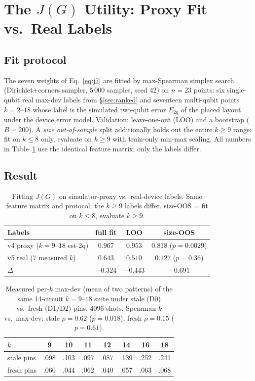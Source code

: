 \documentclass[journal,10pt,twocolumn]{IEEEtran}
\begin{document}
\section{The \texorpdfstring{$J(G)$}{J(G)} Utility: Proxy Fit vs.\ Real Labels}
\label{sec:jreal}

\subsection{Fit protocol}
The seven weights of Eq.~\eqref{eq:j7} are fitted by max-Spearman simplex search (Dirichlet$+$corners sampler,
5\,000 samples, seed 42) on $n{=}23$ points: six single-qubit real max-dev labels from \S\ref{sec:ranked} and
seventeen multi-qubit points $k{=}2$--$18$ whose label is the simulated two-qubit error
$E_{\mathrm{2q}}$ of the placed layout under the device error model. Validation: leave-one-out (LOO) and a
bootstrap ($B{=}200$). A \emph{size out-of-sample} split additionally holds out the entire $k{\ge}9$ range: fit on
$k{\le}8$ only, evaluate on $k{\ge}9$ with train-only min-max scaling. All numbers in Table~\ref{tab:jfit} use the
identical feature matrix; only the labels differ.

\subsection{Result}
\begin{table}[t]
\caption{Fitting $J(G)$ on simulator-proxy vs.\ real-device labels. Same feature matrix and protocol; the $k{\ge}9$
labels differ. size-OOS = fit on $k\le8$, evaluate $k\ge9$.}
\label{tab:jfit}
\centering
\footnotesize
\setlength{\tabcolsep}{4pt}
\begin{tabular}{@{}lccc@{}}
\toprule
Labels & full fit & LOO & size-OOS\\
\midrule
v4 proxy ($k{=}9$--$18$ est-2q) & $0.967$ & $0.953$ & $0.818$ ($p{=}0.0029$)\\
v5 real (7 measured $k$) & $0.643$ & $0.510$ & $0.127$ ($p{=}0.36$)\\
\midrule
$\Delta$ & $-0.324$ & $-0.443$ & $-0.691$\\
\bottomrule
\end{tabular}
\end{table}

\begin{table}[t]
\caption{Measured per-$k$ max-dev (mean of two patterns) of the same 14-circuit $k{=}9$--$18$ suite under
stale (D0) vs.\ fresh (D1/D2) pins, 4096 shots. Spearman $k$ vs.\ max-dev: stale $\rho{=}0.62$
($p{=}0.018$), fresh $\rho{=}0.15$ ($p{=}0.61$).}
\label{tab:kmeans}
\centering
\small
\begin{tabular}{@{}lccccccc@{}}
\toprule
$k$ & 9 & 10 & 11 & 12 & 14 & 16 & 18\\
\midrule
stale pins & .098 & .103 & .097 & .087 & .139 & .252 & .241\\
fresh pins & .060 & .044 & .062 & .040 & .057 & .063 & .068\\
\bottomrule
\end{tabular}
\end{table}
\end{document}
